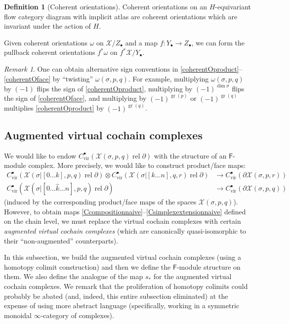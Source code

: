 \documentclass[12pt]{article}
\theoremstyle{definition}
\newtheorem{definition}[theorem]{Definition}
\theoremstyle{remark}
\newtheorem{remark}[theorem]{Remark}
\numberwithin{equation}{subsection}
\newcommand{\X}{\mathcal X}
\newcommand{\sF}{\mathsf{F}}
\newcommand{\vir}{\mathrm{vir}}
\newcommand{\gr}{\operatorname{gr}}
\newcommand{\rel}{\operatorname{rel}}
\begin{document}
\begin{definition}[Coherent orientations]
Coherent orientations on an $H$-equivariant flow category diagram with implicit atlas are coherent orientations which are invariant under the action of $H$.

Given coherent orientations $\omega$ on $\X/Z_\bullet$ and a map $f:Y_\bullet\to Z_\bullet$, we can form the pullback coherent orientations $f^\ast\omega$ on $f^\ast\X/Y_\bullet$.
\end{definition}

\begin{remark}
One can obtain alternative sign conventions in \eqref{coherentOproduct}--\eqref{coherentOface} by ``twisting'' $\omega(\sigma,p,q)$.  For example, multiplying $\omega(\sigma,p,q)$ by $(-1)$ flips the sign of \eqref{coherentOproduct}, multiplying by $(-1)^{\dim\sigma}$ flips the sign of \eqref{coherentOface}, and multiplying by $(-1)^{\gr(p)}$ or $(-1)^{\gr(q)}$ multiplies \eqref{coherentOproduct} by $(-1)^{\gr(q)}$.
\end{remark}

\subsection{Augmented virtual cochain complexes}

We would like to endow $C^\bullet_\vir(\X(\sigma,p,q)\rel\partial)$ with the structure of an $\sF$-module complex.  More precisely, we would like to construct product/face maps:
\begin{align}
\label{Ccompositionnaive}C^\bullet_\vir(\X(\sigma|[0\ldots k],p,q)\rel\partial)\otimes C^\bullet_\vir(\X(\sigma|[k\ldots n],q,r)\rel\partial)&\to C^\bullet_\vir(\partial\X(\sigma,p,r))\\
\label{Csimplexextensionnaive}C^\bullet_\vir(\X(\sigma|[0\ldots\hat k\ldots n],p,q)\rel\partial)&\to C^\bullet_\vir(\partial\X(\sigma,p,q))
\end{align}
(induced by the corresponding product/face maps of the spaces $\X(\sigma,p,q)$).  However, to obtain maps \eqref{Ccompositionnaive}--\eqref{Csimplexextensionnaive} defined on the chain level, we must replace the virtual cochain complexes with certain \emph{augmented virtual cochain complexes} (which are canonically quasi-isomorphic to their ``non-augmented'' counterparts).

In this subsection, we build the augmented virtual cochain complexes (using a homotopy colimit construction) and then we define the $\sF$-module structure on them.  We also define the analogue of the map $s_\ast$ for the augmented virtual cochain complexes.  We remark that the proliferation of homotopy colimits could probably be abated (and, indeed, this entire subsection eliminated) at the expense of using more abstract language (specifically, working in a symmetric monoidal $\infty$-category of complexes).
\end{document}
